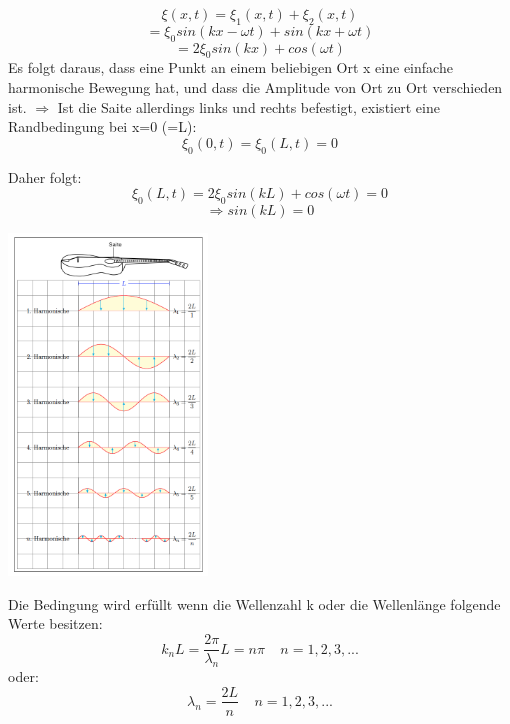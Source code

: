 \documentclass[7pt]{article}
\begin{document}
\begin{multicols*}{3}
\begin{equation*}
\xi(x,t) = \xi _1(x,t) + \xi _2(x,t)
\end{equation*}
\begin{equation*}
= \xi _0 sin(kx-\omega t) + sin(kx+\omega t)
\end{equation*}
\begin{equation*}
= 2 \xi _0 sin(kx) + cos(\omega t)
\end{equation*}
\newline
Es folgt daraus, dass eine Punkt an einem beliebigen Ort x eine einfache harmonische Bewegung hat, und dass die Amplitude von Ort zu Ort verschieden ist.\newline
$\Longrightarrow$ Ist die Saite allerdings links und rechts befestigt, existiert eine Randbedingung bei x=0 (=L):
\begin{equation*}
\xi _0 (0,t) = \xi _0 (L,t) = 0
\end{equation*}

Daher folgt:
\begin{equation*}
\xi _0 (L,t) = 2 \xi _0 sin(kL) + cos(\omega t) = 0
\end{equation*}
\begin{equation*}
	\Longrightarrow sin(kL) = 0
\end{equation*}

\begin{center}
	\includegraphics[width=150pt]{images/harmonische_saite.png}
\end{center}

\columnbreak

Die Bedingung wird erf{\"u}llt wenn die Wellenzahl k oder die Wellenl{\"a}nge folgende Werte besitzen:
\newline
\begin{equation*}
k_n L = \frac{2\pi}{\lambda _n}L = n\pi  \>\>\>\>\> n=1,2,3,...
\end{equation*}
oder:
\begin{equation*}
\lambda _n = \frac{2L}{n}  \>\>\>\>\> n=1,2,3,...
\end{equation*}



\end{multicols*}
\end{document}
